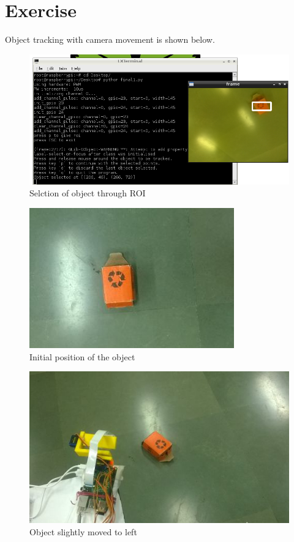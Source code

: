 \documentclass[11pt,a4paper]{article}
\begin{document}
	\section{Exercise}
	Object tracking with camera movement is shown below.
	\begin{figure}[h]
     \includegraphics[scale=0.5]{1.png}
   \centering
 \caption{Selction of object through ROI}
  \end{figure}
  \begin{figure}[h]
 \includegraphics[scale=0.5]{s1.jpg}
   \centering
 \caption{Initial position of the object}
  \end{figure}
  \begin{figure}[h]
 \includegraphics[scale=0.5]{s2.jpg}
   \centering
 \caption{Object slightly moved to left}
  \end{figure}
\end{document}
